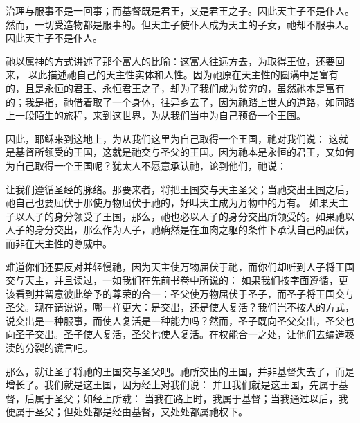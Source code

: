 治理与服事不是一回事；而基督既是君王，又是君王之子。因此天主子不是仆人。然而，一切受造物都是服事的。但天主子使仆人成为天主的子女，祂却不服事人。因此天主子不是仆人。\par

\par

祂以属神的方式讲述了那个富人的比喻：这富人往远方去，为取得王位，还要回来， 以此描述祂自己的天主性实体和人性。因为祂原在天主性的圆满中是富有的，且是永恒的君王、永恒君王之子，却为了我们成为贫穷的，虽然祂本是富有的；我是指，祂借着取了一个身体，往异乡去了，因为祂踏上世人的道路，如同踏上一段陌生的旅程，来到这世界，为从我们当中为自己预备一个王国。\par

因此，耶稣来到这地上，为从我们这里为自己取得一个王国，祂对我们说： 这就是基督所领受的王国，这就是祂交与圣父的王国。因为祂本是永恒的君王，又如何为自己取得一个王国呢？犹太人不愿意承认祂，论到他们，祂说：\par

让我们遵循圣经的脉络。那要来者，将把王国交与天主圣父；当祂交出王国之后，祂自己也要屈伏于那使万物屈伏于祂的，好叫天主成为万物中的万有。 如果天主子以人子的身分领受了王国，那么，祂也必以人子的身分交出所领受的。如果祂以人子的身分交出，那么作为人子，祂确然是在血肉之躯的条件下承认自己的屈伏，而非在天主性的尊威中。\par

难道你们还要反对并轻慢祂，因为天主使万物屈伏于祂，而你们却听到人子将王国交与天主，并且读过，一如我们在先前书卷中所说的： 如果我们按字面遵循，更该看到并留意彼此给予的尊荣的合一：圣父使万物屈伏于圣子，而圣子将王国交与圣父。现在请说说，哪一样更大：是交出，还是使人复活？我们岂不按人的方式，说交出是一种服事，而使人复活是一种能力吗？然而，圣子既向圣父交出，圣父也向圣子交出。圣子使人复活，圣父也使人复活。在权能合一之处，让他们去编造亵渎的分裂的谎言吧。\par

那么，就让圣子将祂的王国交与圣父吧。祂所交出的王国，并非基督失去了，而是增长了。我们就是这王国，因为经上对我们说： 并且我们就是这王国，先属于基督，后属于圣父；如经上所载： 当我在路上时，我属于基督；当我通过以后，我便属于圣父；但处处都是经由基督，又处处都属祂权下。\par

